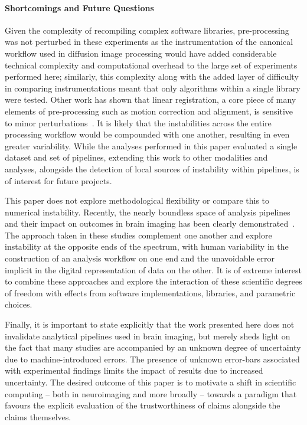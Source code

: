 \documentclass[fleqn,10pt]{SelfArx} %
\newcommand{\new}[1]{{#1}}
\newcommand{\newtwo}[1]{{\color{blue}#1\color{black}}}
\begin{document}
\paragraph{Shortcomings and Future Questions}
Given the complexity of recompiling complex software libraries, pre-processing was not perturbed in these experiments
\new{as the instrumentation of the canonical workflow used in diffusion image processing would have added considerable
technical complexity and computational overhead to the large set of experiments performed here}\newtwo{; similarly, this
complexity along with the added layer of difficulty in comparing instrumentations meant that only algorithms within a
single library were tested}.
Other work has shown that linear registration, a core piece of many elements of pre-processing such as motion
correction and alignment, is sensitive to minor perturbations~\cite{Glatard2015-vc}. It is likely that the
instabilities across the entire processing workflow would be compounded with one another, resulting in even greater
variability. While the analyses performed in this paper evaluated a single dataset and set of pipelines, extending this
work to other modalities and analyses, \new{alongside the detection of local sources of instability within pipelines},
is of interest for future projects.

This paper does not explore methodological flexibility or compare this to numerical instability. Recently, the nearly
boundless space of analysis pipelines and their impact on outcomes in brain imaging has been clearly
demonstrated~\cite{botvinik2020variability}. The approach taken in these studies complement one another and explore
instability at the opposite ends of the spectrum, with human variability in the construction of an analysis workflow on
one end and the unavoidable error implicit in the digital representation of data on the other. It is of extreme
interest to combine these approaches and explore the interaction of these scientific degrees of freedom with effects
from software implementations, libraries, and parametric choices.

Finally, it is important to state explicitly that the work presented here does not invalidate analytical pipelines used
in brain imaging, but merely sheds light on the fact that many studies are accompanied by an unknown degree of
uncertainty due to machine-introduced errors. The presence of unknown error-bars associated with experimental findings
limits the impact of results due to increased uncertainty. The desired outcome of this paper is to motivate a shift in
scientific computing – both in neuroimaging and more broadly – towards a paradigm \new{that} favours the explicit evaluation
of the trustworthiness of claims alongside the claims themselves.
\end{document}
